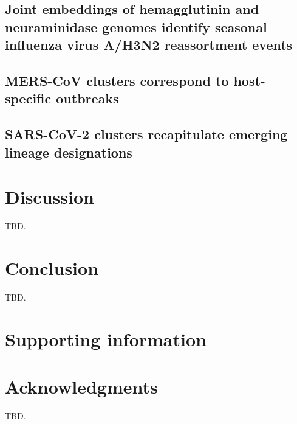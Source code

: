 \documentclass[10pt,letterpaper]{article}
\begin{document}
\subsection*{Joint embeddings of hemagglutinin and neuraminidase genomes identify seasonal influenza virus A/H3N2 reassortment events}

\subsection*{MERS-CoV clusters correspond to host-specific outbreaks}

\subsection*{SARS-CoV-2 clusters recapitulate emerging lineage designations}

\section*{Discussion}

TBD.

\section*{Conclusion}

TBD.

\section*{Supporting information}


\section*{Acknowledgments}
TBD.

\nolinenumbers

%
%
%



\end{document}
